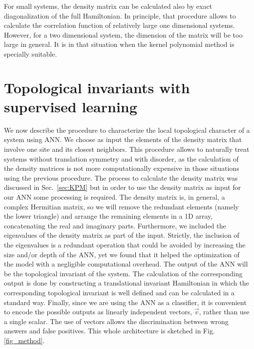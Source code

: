For small systems, the density matrix can be calculated also by exact
diagonalization of the full Hamiltonian. In principle, that procedure
allows to calculate the
correlation function of relatively large one dimensional systems. However, for a
two dimensional system, the dimension of the matrix will be too large in
general. It is in that situation when the kernel polynomial method is specially
suitable.


\section{Topological invariants with supervised learning}
\label{sec:Topo}
We now describe the procedure to characterize the local topological character of
a system using ANN.
We choose as input the elements of the density matrix that involve one site and
its closest neighbors.
This procedure allows to naturally treat systems without translation
symmetry and with disorder, as the calculation of the density matrices is not more
computationally expensive in those situations using the previous procedure.
The process to calculate the density matrix was discussed in
Sec.~\ref{sec:KPM} but in order to use the density matrix as input for our ANN
some processing is required.
The density matrix is, in general, a complex Hermitian matrix, so we will
remove the redundant elements (namely the lower triangle) and arrange the
remaining elements in a 1D array, concatenating the real and imaginary parts.
Furthermore, we included the eigenvalues of the density matrix as part of the
input. Strictly, the inclusion of the eigenvalues is a redundant operation that
could be avoided by increasing the size and/or depth of the ANN, yet we found
that it helped the optimization of the model with a negligible computational
overhead.
The output of the ANN will be the topological invariant of the system.
The calculation of the corresponding output is done by constructing a
translational invariant Hamiltonian in which the corresponding topological
invariant is well defined and can be calculated in a standard way.
Finally, since we are using the ANN as a classifier, it is convenient to encode
the possible outputs as linearly independent vectors, $\vec{v}$, rather
than use a single scalar. The use of vectors allows the discrimination
between wrong answers and false positives.
This whole architecture is sketched in Fig. \ref{fig_method}.



